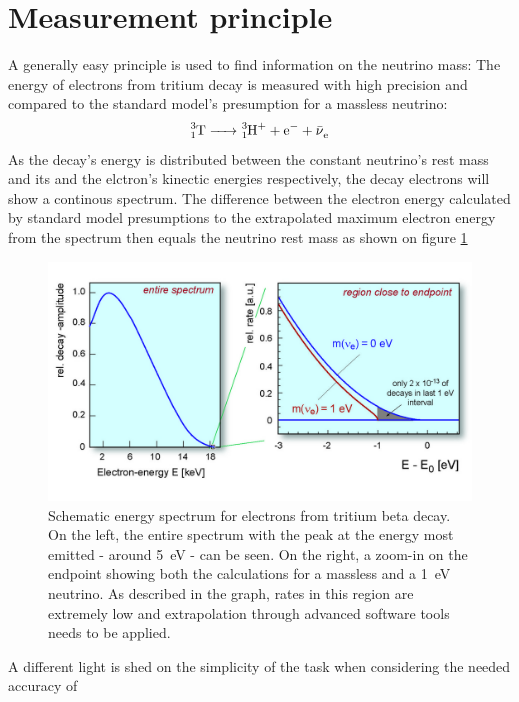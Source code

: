       \section{Measurement principle}
      \label{ch:The KATRIN experiment:sec:Measurement Principle}
      A generally easy principle is used to find information on the neutrino mass: The energy of electrons from tritium decay is measured with high precision and compared to the standard model's presumption for a massless neutrino: 
      \begin{equation}
      	\ce{^3_1T -> ^3_1H^+ + e^- + \bar{\nu}_e}
      \end{equation}
      As the decay's energy is distributed between the constant neutrino's rest mass and its and the elctron's kinectic energies respectively, the decay electrons will show a continous spectrum. The difference between the electron energy calculated by standard model presumptions to the extrapolated maximum electron energy from the spectrum then equals the neutrino rest mass as shown on figure \ref{fig:katrinExperiment:tritiumSpectrum}
      \begin{figure}
	\centering
      	\includegraphics[width = 0.9 \textwidth]{graphics/katrinExperiment/electronSpectrum.jpg}
      	\caption{Schematic energy spectrum for electrons from tritium beta decay. On the left, the entire spectrum with the peak at the energy most emitted - around \SI{5}{\electronvolt} - can be seen. On the right, a zoom-in on the endpoint showing both the calculations for a massless and a \SI{1}{\electronvolt} neutrino. As described in the graph, rates in this region are extremely low and extrapolation through advanced software tools needs to be applied.}
      	\label{fig:katrinExperiment:tritiumSpectrum}
      \end{figure}
      A different light is shed on the simplicity of the task when considering the needed accuracy of 
